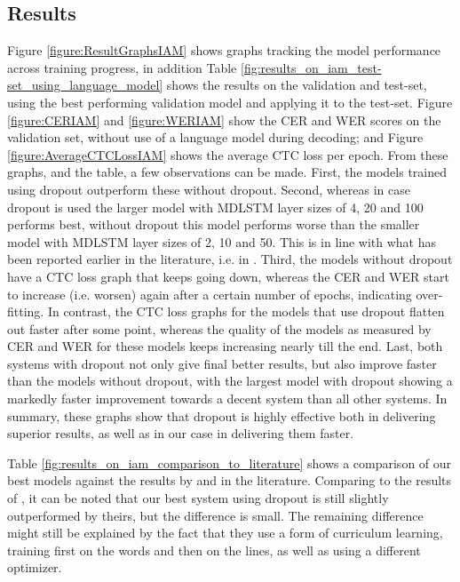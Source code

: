 \documentclass[conference]{IEEEtran}
\renewcommand{\ac}[1]{\gls{#1}}
\begin{document}
\subsection{Results}
Figure \ref{figure:ResultGraphsIAM} shows graphs tracking the model performance across training progress, in addition 
Table \ref{fig:results_on_iam_test-set_using_language_model} shows the results on the validation and test-set, using the 
best performing validation model and applying it to the test-set. Figure \ref{figure:CERIAM}
and \ref{figure:WERIAM} show the \ac{CER} and \ac{WER} scores on the validation set, without use of a language model during decoding; and 
Figure \ref{figure:AverageCTCLossIAM} shows the average CTC loss per epoch. 
From these graphs, and the table, a few observations can be made. First, the models trained using dropout
outperform these without dropout. Second, whereas in case dropout is used the larger model with \ac{MDLSTM} layer sizes of  4, 20 and 100
performs best, without dropout this model performs worse than the smaller model with \ac{MDLSTM} layer sizes of 2, 10 and 50. This is in 
line with what has been reported earlier in the literature, i.e. in \cite{PhamEtAl2014}. Third, the models without dropout 
have a CTC loss graph that keeps going down, whereas the \ac{CER} and \ac{WER} start to increase (i.e. worsen) again after a certain number 
of epochs, indicating over-fitting. In contrast, the CTC loss graphs for the models that use dropout flatten out faster after some point,
whereas the quality of the models as measured by \ac{CER} and \ac{WER} for these models keeps increasing nearly till the end.
Last, both systems with dropout not only give final better results, but also improve faster than the models without dropout, with the largest 
model with dropout showing a markedly faster improvement towards a decent system than all other systems. 
In summary, these graphs show that dropout is highly effective both in delivering superior results, as well as in our case in 
delivering them faster.

Table \ref{fig:results_on_iam_comparison_to_literature} shows a comparison of our best models against the results by \cite{PhamEtAl2014} and
\cite{Voigtlaender2016} in the literature. Comparing to the results of \cite{PhamEtAl2014}, it can be noted that our best system using dropout
is still slightly outperformed by theirs, but the difference is small. The remaining difference might still be explained by the fact that 
they use a form of curriculum learning, training first on the words and then on the lines, as well as using a different optimizer.  
\end{document}
